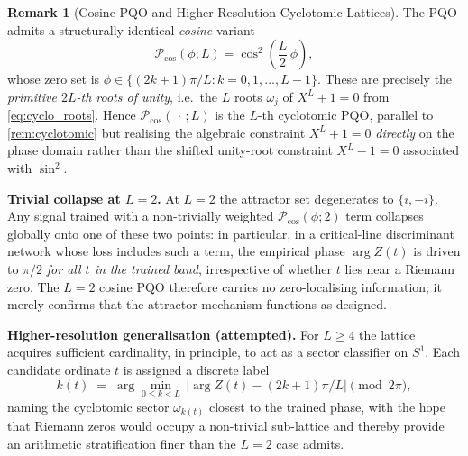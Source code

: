 \documentclass[11pt, a4paper]{article}
\theoremstyle{definition}
\newtheorem{remark}{Remark}[section]
\theoremstyle{plain}
\begin{document}
\begin{remark}[Cosine PQO and Higher-Resolution Cyclotomic Lattices]
\label{rem:cos2_pqo}
The PQO admits a structurally identical \emph{cosine} variant
\begin{equation}
  \mathcal{P}_{\cos}(\phi; L) = \cos^2\!\left(\frac{L}{2}\,\phi\right),
  \label{eq:pqo_cos}
\end{equation}
whose zero set is
$\phi \in \{(2k+1)\pi/L : k = 0, 1, \ldots, L-1\}$. These are precisely
the \emph{primitive $2L$-th roots of unity}, i.e.\ the $L$ roots
$\omega_j$ of $X^L + 1 = 0$ from \cref{eq:cyclo_roots}. Hence
$\mathcal{P}_{\cos}(\,\cdot\,; L)$ is the $L$-th cyclotomic PQO,
parallel to \cref{rem:cyclotomic} but realising the algebraic constraint
$X^L + 1 = 0$ \emph{directly} on the phase domain rather than the shifted
unity-root constraint $X^L - 1 = 0$ associated with $\sin^2$.

\smallskip\noindent\textbf{Trivial collapse at $L = 2$.} At $L = 2$ the
attractor set degenerates to $\{i, -i\}$. Any signal trained with a
non-trivially weighted $\mathcal{P}_{\cos}(\phi; 2)$ term collapses
globally onto one of these two points: in particular, in a critical-line
discriminant network whose loss includes such a term, the empirical
phase $\arg Z(t)$ is driven to $\pi/2$ \emph{for all $t$ in the trained
band}, irrespective of whether $t$ lies near a Riemann zero. The $L=2$
cosine PQO therefore carries no zero-localising information; it merely
confirms that the attractor mechanism functions as designed.

\smallskip\noindent\textbf{Higher-resolution generalisation (attempted).}
For $L \geq 4$ the lattice acquires sufficient cardinality, in
principle, to act as a sector classifier on $S^1$. Each candidate
ordinate $t$ is assigned a discrete label
\begin{equation}
  k(t) \;=\; \arg\min_{0 \leq k < L} \,\big|\arg Z(t) - (2k{+}1)\pi/L\big|
  \pmod{2\pi},
  \label{eq:cyclo_label}
\end{equation}
naming the cyclotomic sector $\omega_{k(t)}$ closest to the trained
phase, with the hope that Riemann zeros would occupy a non-trivial
sub-lattice and thereby provide an arithmetic stratification finer than
the $L=2$ case admits.


\end{remark}
\end{document}
